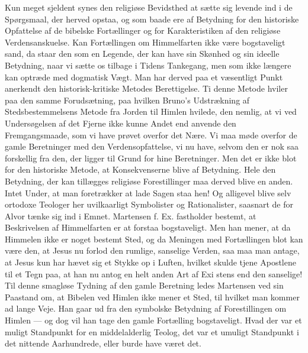 \documentclass[12pt,a4paper]{article}
\newcommand{\opage}[1]{\marginnote{\footnotesize\textit{[#1]}}}
\begin{document}
Kun meget sjeldent synes den religiøse Bevidsthed at sætte sig levende ind
i de Spørgsmaal, der herved opstaa, og som baade ere af Betydning for den
historiske Opfattelse af de bibelske Fortællinger og for Karakteristiken
af den religiøse Verdensanskuelse. Kan Fortællingen om Himmelfarten ikke
være bogstaveligt sand, da staar den som en Legende, der kan have sin
Skønhed og sin ideelle Betydning, naar vi sætte os tilbage i Tidens
Tankegang, men som ikke længere kan optræde med dogmatisk Vægt. Man har
derved paa et væsentligt Punkt anerkendt den historisk-kritiske Metodes
Berettigelse. Ti denne Metode hviler paa den samme Forudsætning, paa
hvilken Bruno's Udstrækning af Stedsbestemmelsens Metode fra Jorden til
Himlen hvilede, den nemlig, at vi ved Undersøgelsen af det Fjerne ikke
kunne Andet end anvende den Fremgangsmaade, som vi have prøvet overfor det
Nære. Vi maa møde overfor de gamle Beretninger med den Verdensopfattelse,
vi nu have, selvom den er nok saa forskellig fra den, der ligger til Grund
for hine Beretninger. Men det er ikke blot for den historiske Metode, at
Konsekvenserne blive af Betydning. Hele den Betydning, der kan tillægges
religiøse Forestillinger maa derved blive en anden. Intet Under, at man
foretrækker at lade Sagen staa hen! Og alligevel blive selv ortodoxe
Teologer her uvilkaarligt Symbolister og Rationalister, saasnart de for
Alvor tænke sig ind i Emnet. Martensen f. Ex. fastholder bestemt, at
Beskrivelsen af Himmelfarten er at forstaa bogstaveligt. Men han mener, at
da Himmelen ikke er noget bestemt Sted, og da Meningen med Fortællingen
blot kan være den, at Jesus nu forlod den rumlige, sanselige Verden, saa
maa man antage, at Jesus kun har hævet sig et Stykke op i Luften, hvilket
skulde tjene Apostlene til et Tegn paa, at han nu antog en helt anden Art
af Exi%
\opage{10}stens end den sanselige! Til denne smagløse Tydning af den gamle
Beretning ledes Martensen ved sin Paastand om, at Bibelen ved Himlen ikke
mener et Sted, til hvilket man kommer ad lange Veje. Han gaar ud fra den
symbolske Betydning af Forestillingen om Himlen --- og dog vil han tage
den gamle Fortælling bogstaveligt. Hvad der var et muligt Standpunkt for
en middelalderlig Teolog, det var et umuligt Standpunkt i det nittende
Aarhundrede, eller burde have været det.
\end{document}
